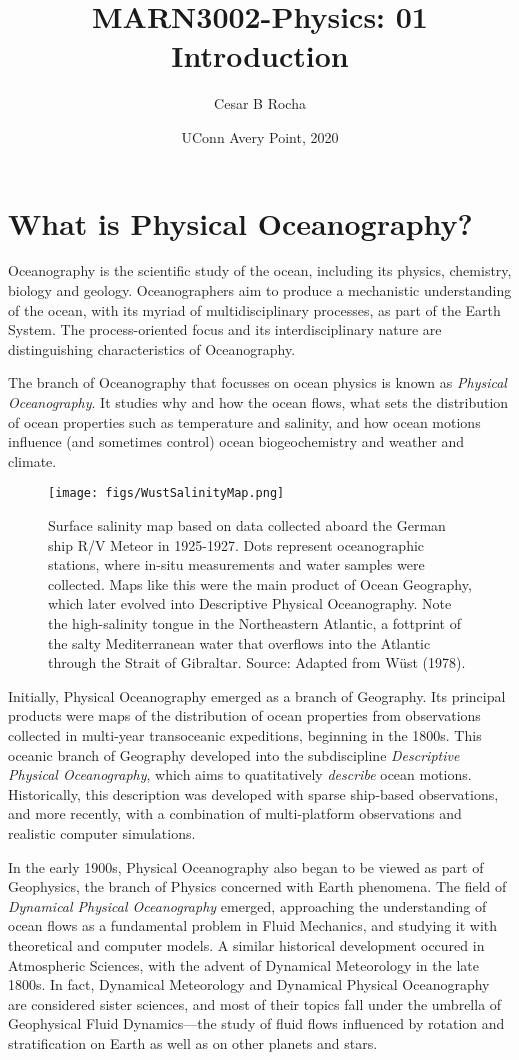 \documentclass[11pt]{article}
\title{MARN3002-Physics: 01 Introduction}
\author{Cesar B Rocha}
\date{UConn Avery Point, 2020}
\newcommand{\PO}{Physical Oceanography}
\begin{document}
\maketitle

\section{What is Physical Oceanography?}
Oceanography is the scientific study of the ocean, including its physics,
chemistry, biology and geology.  Oceanographers aim to produce a mechanistic understanding
of the ocean, with its myriad of multidisciplinary processes,
as part of the Earth System. The process-oriented focus and its interdisciplinary nature
are distinguishing characteristics of Oceanography.

The branch of Oceanography that focusses on ocean physics is known as \emph{Physical
Oceanography}. It studies why and how the ocean flows, what sets the distribution
of ocean properties such as temperature and salinity, and how ocean motions
influence (and sometimes control) ocean biogeochemistry and weather and climate.



\begin{figure}[H]\label{wustmap}
\centering
\texttt{[image: figs/WustSalinityMap.png]}
\caption{\small Surface salinity map based on data collected aboard the German ship
R/V Meteor in 1925-1927. Dots represent oceanographic stations, where in-situ measurements and
water samples were collected. Maps like this were the main product of Ocean Geography,
which later evolved into Descriptive \PO. Note the high-salinity tongue in the Northeastern
Atlantic, a fottprint of the salty Mediterranean water that overflows into the Atlantic
through the Strait of Gibraltar. Source: Adapted from Wüst (1978).}
\end{figure}

Initially, \PO{} emerged as a branch of Geography. Its principal products were maps
of the distribution of ocean properties from observations collected in multi-year
transoceanic expeditions, beginning in the 1800s. This oceanic branch of Geography
developed into the subdiscipline \emph{Descriptive \PO{}}, which aims to quatitatively
\emph{describe} ocean motions. Historically, this description was developed
with sparse ship-based observations, and more recently, with a combination of
multi-platform observations and realistic computer simulations.

In the early 1900s, \PO{} also began to be viewed as part of
Geophysics, the branch of Physics concerned with Earth phenomena. The field of
\emph{Dynamical \PO{}} emerged, approaching the understanding of ocean flows as a
fundamental problem in Fluid Mechanics, and studying it with theoretical and computer
models. A similar historical development occured in
Atmospheric Sciences, with the advent of Dynamical Meteorology in the late 1800s.
In fact, Dynamical Meteorology and Dynamical \PO{} are considered sister sciences,
and most of their topics fall under the umbrella of Geophysical Fluid
Dynamics––the study of fluid flows influenced by rotation and
stratification on Earth as well as on other planets and stars.
\end{document}
